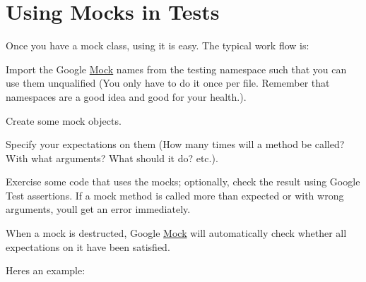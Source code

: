 \section*{Using Mocks in Tests}

Once you have a mock class, using it is easy. The typical work flow is\+:


\begin{DoxyEnumerate}
\item Import the Google \mbox{\hyperlink{class_mock}{Mock}} names from the {\ttfamily testing} namespace such that you can use them unqualified (You only have to do it once per file. Remember that namespaces are a good idea and good for your health.).
\end{DoxyEnumerate}
\begin{DoxyEnumerate}
\item Create some mock objects.
\end{DoxyEnumerate}
\begin{DoxyEnumerate}
\item Specify your expectations on them (How many times will a method be called? With what arguments? What should it do? etc.).
\end{DoxyEnumerate}
\begin{DoxyEnumerate}
\item Exercise some code that uses the mocks; optionally, check the result using Google Test assertions. If a mock method is called more than expected or with wrong arguments, you\textquotesingle{}ll get an error immediately.
\end{DoxyEnumerate}
\begin{DoxyEnumerate}
\item When a mock is destructed, Google \mbox{\hyperlink{class_mock}{Mock}} will automatically check whether all expectations on it have been satisfied.
\end{DoxyEnumerate}

Here\textquotesingle{}s an example\+:


